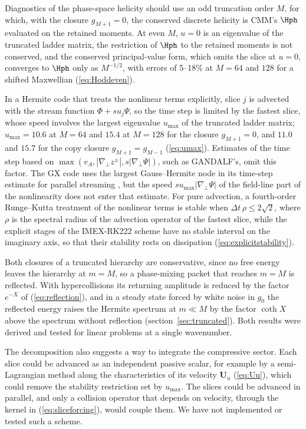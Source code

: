 Diagnostics of the phase-space helicity should use an odd truncation order $M$, for which, with the closure $g_{M+1}=0$, the conserved discrete helicity is CMM's $\Hph$ evaluated on the retained moments. At even $M$, $u=0$ is an eigenvalue of the truncated ladder matrix, the restriction of $\Hph$ to the retained moments is not conserved, and the conserved principal-value form, which omits the slice at $u=0$, converges to $\Hph$ only as $M^{-1/2}$, with errors of 5--18\% at $M=64$ and $128$ for a shifted Maxwellian (\ref{eq:Hoddeven}).

In a Hermite code that treats the nonlinear terms explicitly, slice $j$ is advected with the stream function $\Phi+su_j\Psi$, so the time step is limited by the fastest slice, whose speed involves the largest eigenvalue $u_{\max}$ of the truncated ladder matrix; $u_{\max}=10.6$ at $M=64$ and $15.4$ at $M=128$ for the closure $g_{M+1}=0$, and $11.0$ and $15.7$ for the copy closure $g_{M+1}=g_{M-1}$ (\ref{eq:umax}). Estimates of the time step based on $\max(v_A,|\nabla_\perp z^\pm|,s|\nabla_\perp\Psi|)$, such as GANDALF's, omit this factor. The GX code uses the largest Gauss--Hermite node in its time-step estimate for parallel streaming \citep{Mandell2024}, but the speed $su_{\max}|\nabla_\perp\Psi|$ of the field-line part of the nonlinearity does not enter that estimate. For pure advection, a fourth-order Runge--Kutta treatment of the nonlinear terms is stable when $\Delta t\,\rho\le2\sqrt2$, where $\rho$ is the spectral radius of the advection operator of the fastest slice, while the explicit stages of the IMEX-RK222 scheme have no stable interval on the imaginary axis, so that their stability rests on dissipation (\ref{eq:explicitstability}).

Both closures of a truncated hierarchy are conservative, since no free energy leaves the hierarchy at $m=M$, so a phase-mixing packet that reaches $m=M$ is reflected. With hypercollisions its returning amplitude is reduced by the factor $e^{-X}$ of (\ref{eq:reflection}), and in a steady state forced by white noise in $g_0$ the reflected energy raises the Hermite spectrum at $m\ll M$ by the factor $\coth X$ above the spectrum without reflection (section~\ref{sec:truncated}). Both results were derived and tested for linear problems at a single wavenumber.

The decomposition also suggests a way to integrate the compressive sector. Each slice could be advanced as an independent passive scalar, for example by a semi-Lagrangian method along the characteristics of its velocity $\boldsymbol U_u$ (\ref{eq:Uu}), which could remove the stability restriction set by $u_{\max}$. The slices could be advanced in parallel, and only a collision operator that depends on velocity, through the kernel in (\ref{eq:sliceforcing}), would couple them. We have not implemented or tested such a scheme.

